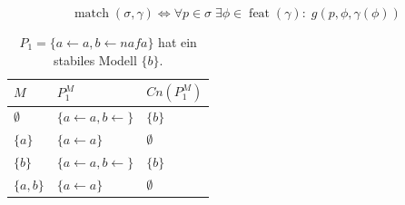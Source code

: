 %
%




$$\operatorname{match}(\sigma, \gamma) \Leftrightarrow \forall p \in \sigma \; \exists \phi \in \operatorname{feat}(\gamma): \; g(p, \phi, \gamma(\phi))$$


\begin{table}
    \centering
        \begin{tabularx}{0.5\textwidth}{l|X|l}
            $M$             & $P_1^M$                               & $Cn(P_1^M)$  \\
            \hline
            $\emptyset$     & $\{ a \leftarrow a, b \leftarrow \}$  & $\{ b \}$     \\
            $\{ a \}$       & $\{ a \leftarrow a \}$                & $\emptyset$   \\
            $\{ b \}$       & $\{ a \leftarrow a, b \leftarrow \}$  & $\{ b \}$     \\
            $\{ a, b \}$    & $\{ a \leftarrow a \}$                & $\emptyset$   \\
        \end{tabularx}
    \caption[$P_1 = \{ a \leftarrow a, b \leftarrow naf a \}$ hat ein stabiles Modell.]{$P_1 = \{ a \leftarrow a, b \leftarrow naf a \}$ hat ein stabiles Modell $\{ b \}$.}
    \label{tab:Ein_stabiles_Modell}
\end{table}

